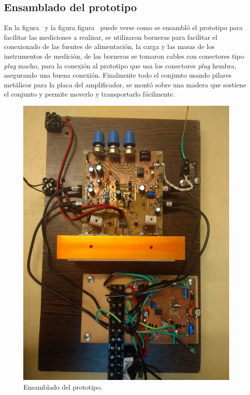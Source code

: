 \subsection{Ensamblado del prototipo}

En la figura~ y la figura figura~ puede verse como se ensambló el prototipo para facilitar las mediciones a realizar, se utilizaron borneras para facilitar el conexionado de las fuentes de alimentación, la carga y las masas de los instrumentos de medición, de las borneras se tomaron cables con conectores tipo \textit{plug} macho, para la conexión al prototipo que usa los conectores \textit{plug} hembra, asegurando una buena conexión. Finalmente todo el conjunto usando pilares metálicos para la placa del amplificador, se montó sobre una madera que sostiene el conjunto y permite moverlo y transportarlo fácilmente.

\begin{figure}[H]
    \centering
    \includegraphics[height=0.95 \textwidth, angle=90]{img/fotos/8.jpg}
    \caption{Ensamblado del prototipo.}
    \label{fig:prototype1}
\end{figure}


\vfill

\clearpage



